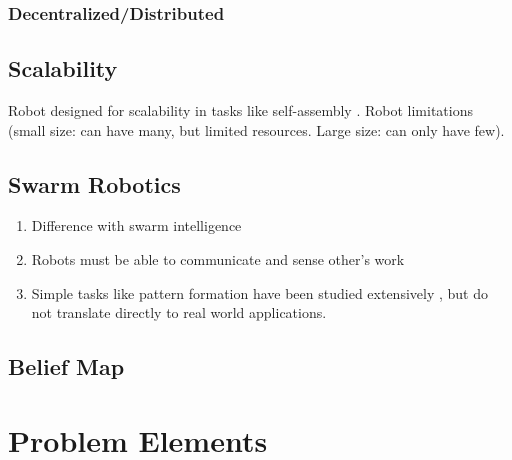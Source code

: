 \subsubsection{Decentralized/Distributed}

\subsection{Scalability}
Robot designed for scalability \cite{rubenstein2012kilobot} in tasks like self-assembly \cite{rubenstein2014programmable}.
Robot limitations (small size: can have many, but limited resources. Large size: can only have few).

\subsection{Swarm Robotics}
\begin{enumerate}
    \item Difference with swarm intelligence
    \item Robots must be able to communicate and sense other's work
    \item Simple tasks like pattern formation have been studied extensively \cite{hamann2008framework,vicsek2012collective,coppola2019provable}, but do not translate directly to real world applications.
\end{enumerate}


\subsection{Belief Map}


\clearpage

\section{Problem Elements}  %

